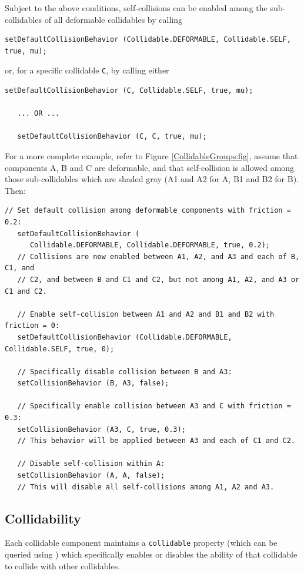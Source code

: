 Subject to the above conditions, self-collisions can be enabled among
the sub-collidables of all deformable collidables by calling
%
\begin{lstlisting}[]
   setDefaultCollisionBehavior (Collidable.DEFORMABLE, Collidable.SELF, true, mu);
\end{lstlisting}
%
or, for a specific collidable {\tt C}, by calling either
%
\begin{lstlisting}[]
   setDefaultCollisionBehavior (C, Collidable.SELF, true, mu);

   ... OR ...

   setDefaultCollisionBehavior (C, C, true, mu);
\end{lstlisting}
%

For a more complete example, refer to Figure
\ref{CollidableGroups:fig}, assume that components A, B and C are
deformable, and that self-collision is allowed among those
sub-collidables which are shaded gray (A1 and A2 for A, B1 and B2 for
B). Then:
%
\begin{lstlisting}[]
   // Set default collision among deformable components with friction = 0.2:
   setDefaultCollisionBehavior (
      Collidable.DEFORMABLE, Collidable.DEFORMABLE, true, 0.2);
   // Collisions are now enabled between A1, A2, and A3 and each of B, C1, and
   // C2, and between B and C1 and C2, but not among A1, A2, and A3 or C1 and C2.

   // Enable self-collision between A1 and A2 and B1 and B2 with friction = 0:
   setDefaultCollisionBehavior (Collidable.DEFORMABLE, Collidable.SELF, true, 0);
    
   // Specifically disable collision between B and A3:
   setCollisionBehavior (B, A3, false);

   // Specifically enable collision between A3 and C with friction = 0.3:
   setCollisionBehavior (A3, C, true, 0.3);
   // This behavior will be applied between A3 and each of C1 and C2.

   // Disable self-collision within A:
   setCollisionBehavior (A, A, false);
   // This will disable all self-collisions among A1, A2 and A3.
\end{lstlisting}
%

\subsection{Collidability}
\label{collidability:sec}

Each collidable component maintains a {\tt collidable} property
(which can be queried using
)
which specifically enables or disables the ability of that collidable
to collide with other collidables.

